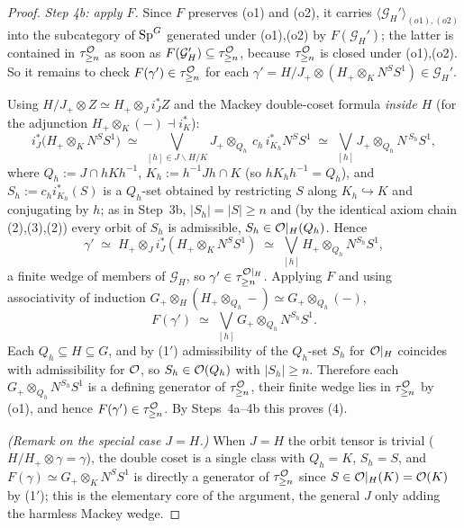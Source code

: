 \begin{proof}
\emph{Step 4b: apply $F$.} Since $F$ preserves (o1) and (o2), it carries
$\langle\mathcal G_H'\rangle_{(o1),(o2)}$ into the subcategory of $\mathrm{Sp}^G$
generated under (o1),(o2) by $F(\mathcal G_H')$; the latter is contained in
$\tau^{\mathcal{O}}_{\ge n}$ as soon as $F(\mathcal G_H')\subseteq\tau^{\mathcal{O}}_{\ge n}$,
because $\tau^{\mathcal{O}}_{\ge n}$ is closed under (o1),(o2). So it remains to check
$F(\gamma')\in\tau^{\mathcal{O}}_{\ge n}$ for each $\gamma'=H/J_+\otimes(H_+\otimes_K N^S S^1)\in\mathcal G_H'$.

Using $H/J_+\otimes Z\simeq H_+\otimes_J i_J^\ast Z$ and the Mackey double-coset
formula \emph{inside $H$} (for the adjunction $H_+\otimes_K(-)\dashv i_K^\ast$):
\[
i_J^\ast\bigl(H_+\otimes_K N^S S^1\bigr)\;\simeq\;
\bigvee_{[h]\in J\backslash H/K} J_+\otimes_{Q_h}\,c_h\,i_{K_h}^\ast N^S S^1
\;\simeq\;\bigvee_{[h]} J_+\otimes_{Q_h} N^{\,S_h}S^1,
\]
where $Q_h:=J\cap hKh^{-1}$, $K_h:=h^{-1}Jh\cap K$ (so $hK_hh^{-1}=Q_h$), and
$S_h:=c_h i_{K_h}^\ast(S)$ is a $Q_h$-set obtained by restricting $S$ along
$K_h\hookrightarrow K$ and conjugating by $h$; as
in Step~3b, $|S_h|=|S|\ge n$ and (by the identical axiom chain (2),(3),(2)) every
orbit of $S_h$ is admissible, $S_h\in\mathcal{O}|_H(Q_h)$. Hence
\[
\gamma'\;\simeq\;H_+\otimes_J i_J^\ast(H_+\otimes_K N^S S^1)
\;\simeq\;\bigvee_{[h]}H_+\otimes_{Q_h}N^{S_h}S^1 ,
\]
a finite wedge of members of $\mathcal G_H$, so $\gamma'\in\tau^{\mathcal{O}|_H}_{\ge n}$.
Applying $F$ and using associativity of induction
$G_+\otimes_H(H_+\otimes_{Q_h}-)\simeq G_+\otimes_{Q_h}(-)$,
\[
F(\gamma')\;\simeq\;\bigvee_{[h]} G_+\otimes_{Q_h} N^{S_h}S^1 .
\]
Each $Q_h\subseteq H\subseteq G$, and by (1$'$) admissibility of the $Q_h$-set
$S_h$ for $\mathcal{O}|_H$ coincides with admissibility for $\mathcal{O}$, so
$S_h\in\mathcal{O}(Q_h)$ with $|S_h|\ge n$. Therefore each
$G_+\otimes_{Q_h}N^{S_h}S^1$ is a defining generator of $\tau^{\mathcal{O}}_{\ge n}$,
their finite wedge lies in $\tau^{\mathcal{O}}_{\ge n}$ by (o1), and hence
$F(\gamma')\in\tau^{\mathcal{O}}_{\ge n}$. By Steps~4a--4b this proves (4).

\emph{(Remark on the special case $J=H$.)} When $J=H$ the orbit tensor is
trivial ($H/H_+\otimes\gamma=\gamma$), the double coset is a single class with
$Q_h=K$, $S_h=S$, and $F(\gamma)\simeq G_+\otimes_K N^S S^1$ is directly a
generator of $\tau^{\mathcal{O}}_{\ge n}$ since $S\in\mathcal{O}|_H(K)=\mathcal{O}(K)$ by (1$'$);
this is the elementary core of the argument, the general $J$ only adding the
harmless Mackey wedge.
\end{proof}

